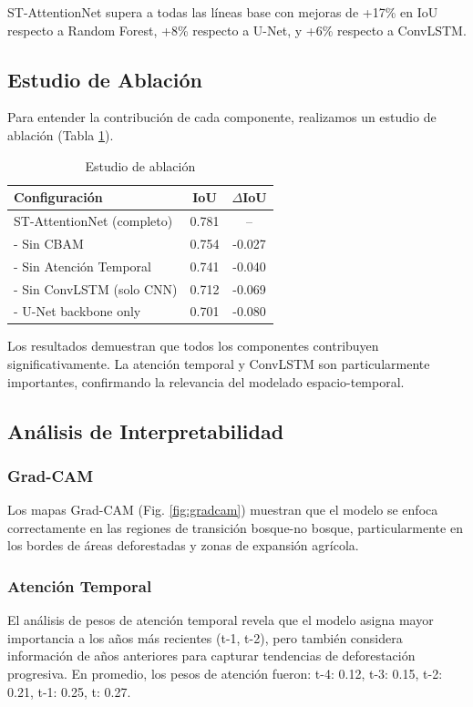 \documentclass[conference]{IEEEtran}
\begin{document}
ST-AttentionNet supera a todas las líneas base con mejoras de +17\% en IoU respecto a Random Forest, +8\% respecto a U-Net, y +6\% respecto a ConvLSTM.

\subsection{Estudio de Ablación}

Para entender la contribución de cada componente, realizamos un estudio de ablación (Tabla \ref{tab:ablation}).

\begin{table}[h]
\centering
\caption{Estudio de ablación}
\label{tab:ablation}
\begin{tabular}{lcc}
\toprule
\textbf{Configuración} & \textbf{IoU} & \textbf{$\Delta$IoU} \\
\midrule
ST-AttentionNet (completo) & 0.781 & -- \\
- Sin CBAM & 0.754 & -0.027 \\
- Sin Atención Temporal & 0.741 & -0.040 \\
- Sin ConvLSTM (solo CNN) & 0.712 & -0.069 \\
- U-Net backbone only & 0.701 & -0.080 \\
\bottomrule
\end{tabular}
\end{table}

Los resultados demuestran que todos los componentes contribuyen significativamente. La atención temporal y ConvLSTM son particularmente importantes, confirmando la relevancia del modelado espacio-temporal.

\subsection{Análisis de Interpretabilidad}

\subsubsection{Grad-CAM}
Los mapas Grad-CAM (Fig. \ref{fig:gradcam}) muestran que el modelo se enfoca correctamente en las regiones de transición bosque-no bosque, particularmente en los bordes de áreas deforestadas y zonas de expansión agrícola.

\subsubsection{Atención Temporal}
El análisis de pesos de atención temporal revela que el modelo asigna mayor importancia a los años más recientes (t-1, t-2), pero también considera información de años anteriores para capturar tendencias de deforestación progresiva. En promedio, los pesos de atención fueron: t-4: 0.12, t-3: 0.15, t-2: 0.21, t-1: 0.25, t: 0.27.
\end{document}
